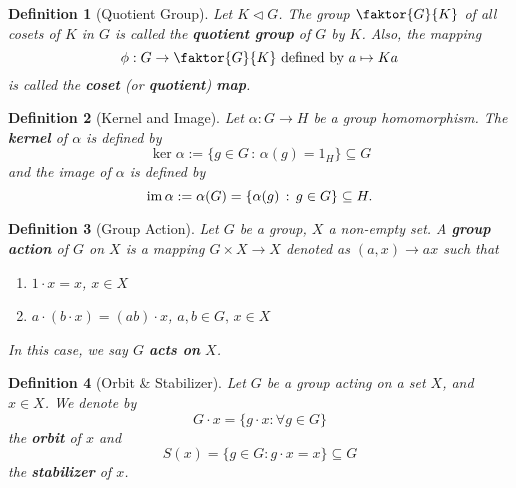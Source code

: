 \documentclass[9pt,landscape,a4paper]{article}
\newcommand{\hldefn}[1]{\textcolor{base16-eighties-magenta}{\textbf{#1}}}
\newcommand{\hlnoteb}[1]{\textcolor{base16-eighties-magenta}{\textbf{#1}}}
\theoremstyle{empty}
\newtheorem{defn}{Definition}
\begin{document}
\begin{multicols*}{5}
\begin{defn}[Quotient Group]
\label{defn:quotient_group}
  Let $K \triangleleft G$. The group $\faktor{G}{K}$ of all cosets of $K$ in $G$ is called the \hlnoteb{quotient group} of $G$ by $K$. Also, the mapping
  \begin{equation*}
    \phi: G \to \faktor{G}{K} \text{ defined by } a \mapsto Ka
  \end{equation*}
  is called the \hlnoteb{coset} (or \hlnoteb{quotient}) \hlnoteb{map}.
\end{defn}

\begin{defn}[Kernel and Image]
\label{defn:kernel_and_image}
  Let $\alpha: G \to H$ be a group homomorphism. The \hlnoteb{kernel} of $\alpha$ is defined by
  \begin{equation*}
    \ker \alpha := \{g \in G \, : \, \alpha(g) = 1_H \} \subseteq G
  \end{equation*}
  and the image of $\alpha$ is defined by
  \begin{equation*}
    \operatorname{im} \alpha := \alpha(G) = \{\alpha(g) \, : \, g \in G \} \subseteq H.
  \end{equation*}
\end{defn}

\begin{defn}[Group Action]
\label{defn:group_action}
  Let $G$ be a group, $X$ a non-empty set. A \hlnoteb{group action} of $G$ on $X$ is a mapping $G \times X \to X$ denoted as $(a, x) \to ax$ such that
  \begin{enumerate}
    \item $1 \cdot x = x$, $x \in X$
    \item $a \cdot (b \cdot x) = (ab) \cdot x$, $a, b \in G, \, x \in X$
  \end{enumerate}
  In this case, we say $G$ \hldefn{acts on} $X$.
\end{defn}

\begin{defn}[Orbit \& Stabilizer]
\label{defn:orbit_n_stabilizer}
  Let $G$ be a group acting on a set $X$, and $x \in X$. We denote by
  \begin{equation*}
    G \cdot x = \{g \cdot x : \forall g \in G \}
  \end{equation*}
  the \hlnoteb{orbit} of $x$ and
  \begin{equation*}
    S(x) = \{g \in G : g \cdot x = x \} \subseteq G
  \end{equation*}
  the \hlnoteb{stabilizer} of $x$.
\end{defn}


\end{multicols*}
\end{document}
